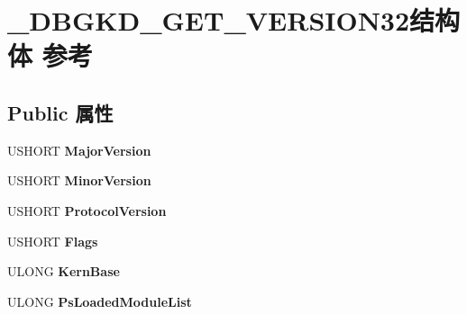 \hypertarget{struct___d_b_g_k_d___g_e_t___v_e_r_s_i_o_n32}{}\section{\+\_\+\+D\+B\+G\+K\+D\+\_\+\+G\+E\+T\+\_\+\+V\+E\+R\+S\+I\+O\+N32结构体 参考}
\label{struct___d_b_g_k_d___g_e_t___v_e_r_s_i_o_n32}
\subsection*{Public 属性}
\begin{DoxyCompactItemize}
\item 
\mbox{\label{struct___d_b_g_k_d___g_e_t___v_e_r_s_i_o_n32_a9f8355f280006e8848ca2893de344eae}} 
U\+S\+H\+O\+RT {\bfseries Major\+Version}
\item 
\mbox{\label{struct___d_b_g_k_d___g_e_t___v_e_r_s_i_o_n32_abf6ee3a5118679acf0491e2914feca57}} 
U\+S\+H\+O\+RT {\bfseries Minor\+Version}
\item 
\mbox{\label{struct___d_b_g_k_d___g_e_t___v_e_r_s_i_o_n32_aaee709e106356fa00de935631901c647}} 
U\+S\+H\+O\+RT {\bfseries Protocol\+Version}
\item 
\mbox{\label{struct___d_b_g_k_d___g_e_t___v_e_r_s_i_o_n32_a4929c58f9100ef679343bb07db275f2e}} 
U\+S\+H\+O\+RT {\bfseries Flags}
\item 
\mbox{\label{struct___d_b_g_k_d___g_e_t___v_e_r_s_i_o_n32_af19810a29b54d09d79f87e45e2b9729a}} 
U\+L\+O\+NG {\bfseries Kern\+Base}
\item 
\mbox{\label{struct___d_b_g_k_d___g_e_t___v_e_r_s_i_o_n32_aacba7d27b37bd33565d4c4c3eec7a854}} 
U\+L\+O\+NG {\bfseries Ps\+Loaded\+Module\+List}
\item 
\mbox{\label{struct___d_b_g_k_d___g_e_t___v_e_r_s_i_o_n32_a82b3c45f02e6b5ba8361bc859fa6ec5d}} 

\end{DoxyCompactItemize}
